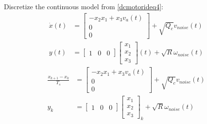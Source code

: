 	
	Discretize the continuous model from \autoref{dcmotorideq4}:
	\begin{equation}
		\begin{split}
			\dot{x}(t) &=
			\begin{bmatrix}
				-x_2 x_1 + x_3 v_a(t) \\
				0                     \\
				0                     
			\end{bmatrix} +\sqrt{Q_c}v_{noise}(t)\\
			y(t) &= 
			\begin{bmatrix}
				1 & 0 & 0 
			\end{bmatrix}
			\begin{bmatrix}
				x_1 \\
				x_2 \\
				x_3 
			\end{bmatrix}(t)+\sqrt{R}\omega_{noise}(t)
		\end{split}
		\label{dcmotorideq5}
	\end{equation}
	\begin{equation}
		\begin{split}
			\frac{x_{k+1} - x_k}{T_s} &=
			\begin{bmatrix}
				-x_2 x_1 + x_3 v_a(t) \\
				0                     \\
				0                     
			\end{bmatrix} +\sqrt{Q_c}v_{noise}(t)\\
			y_k &= 
			\begin{bmatrix}
				1 & 0 & 0 
			\end{bmatrix}
			\begin{bmatrix}
				x_1 \\
				x_2 \\
				x_3 
			\end{bmatrix}_k+\sqrt{R}\omega_{noise}(t)
		\end{split}
		\label{dcmotorideq6}
	\end{equation}

